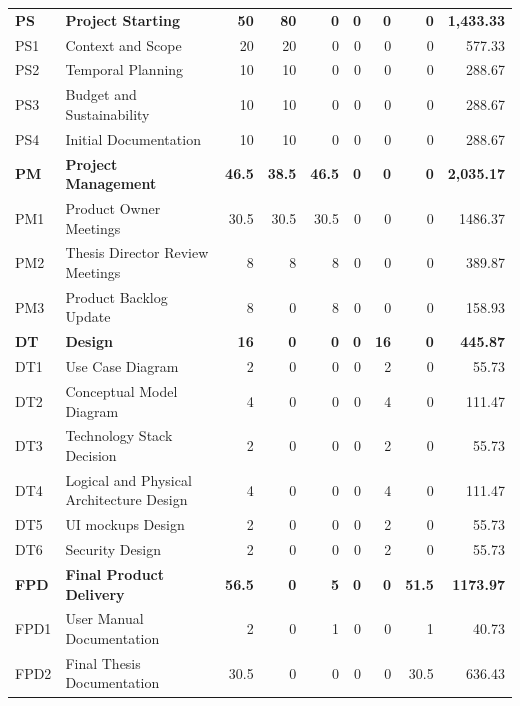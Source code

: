 \begin{longtable}{@{}l p{8.5cm} r r r r r r r@{}}
\rowcolor{gray!20}
\textbf{PS} & \textbf{Project Starting} & \textbf{50} & \textbf{80} & \textbf{0} & \textbf{0} & \textbf{0} & \textbf{0} & \textbf{1,433.33} \\ 
\rowcolor{gray!05}
PS1 & Context and Scope & 20 & 20 & 0 & 0 & 0 & 0 & 577.33 \\
\rowcolor{gray!05}
PS2 & Temporal Planning & 10 & 10 & 0 & 0 & 0 & 0 & 288.67 \\
\rowcolor{gray!05}
PS3 & Budget and Sustainability & 10 & 10 & 0 & 0 & 0 & 0 & 288.67 \\
\rowcolor{gray!05}
PS4 & Initial Documentation & 10 & 10 & 0 & 0 & 0 & 0 & 288.67 \\
\rowcolor{gray!20}
\textbf{PM} & \textbf{Project Management} & \textbf{46.5} & \textbf{38.5} & \textbf{46.5} & \textbf{0} & \textbf{0} & \textbf{0} & \textbf{2,035.17} \\
\rowcolor{gray!05}
PM1 & Product Owner Meetings & 30.5 & 30.5 & 30.5 & 0 & 0 & 0 & 1486.37 \\  
\rowcolor{gray!05}
PM2 & Thesis Director Review Meetings & 8 & 8 & 8 & 0 & 0 & 0 & 389.87 \\
\rowcolor{gray!05}
PM3 & Product Backlog Update & 8 & 0 & 8 & 0 & 0 & 0 & 158.93 \\
\rowcolor{gray!20}
\textbf{DT} & \textbf{Design} & \textbf{16} & \textbf{0} & \textbf{0} & \textbf{0} & \textbf{16} & \textbf{0} & \textbf{445.87} \\
\rowcolor{gray!05}
DT1 & Use Case Diagram & 2 & 0 & 0 & 0 & 2 & 0 & 55.73 \\
\rowcolor{gray!05}
DT2 & Conceptual Model Diagram & 4 & 0 & 0 & 0 & 4 & 0 & 111.47 \\
\rowcolor{gray!05}
DT3 & Technology Stack Decision & 2 & 0 & 0 & 0 & 2 & 0 & 55.73 \\
\rowcolor{gray!05}
DT4 & Logical and Physical Architecture Design & 4 & 0 & 0 & 0 & 4 & 0 & 111.47 \\
\rowcolor{gray!05}
DT5 & UI mockups Design & 2 & 0 & 0 & 0 & 2 & 0 & 55.73 \\
\rowcolor{gray!05}
DT6 & Security Design & 2 & 0 & 0 & 0 & 2 & 0 & 55.73 \\
\rowcolor{gray!20}
\textbf{FPD} & \textbf{Final Product Delivery} & \textbf{56.5} & \textbf{0} & \textbf{5} & \textbf{0} & \textbf{0} & \textbf{51.5} & \textbf{1173.97} \\
\rowcolor{gray!05}
FPD1 & User Manual Documentation & 2 & 0 & 1 & 0 & 0 & 1 & 40.73 \\
\rowcolor{gray!05}
FPD2 & Final Thesis Documentation & 30.5 & 0 & 0 & 0 & 0 & 30.5 & 636.43 \\

\end{longtable}
